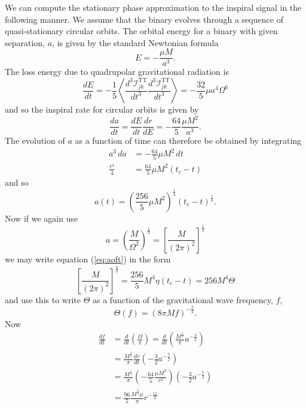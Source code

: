 We can compute the stationary phase approximation to the inspiral signal in
the following manner. We assume that the binary evolves through a sequence of
quasi-stationary circular orbits. The orbital energy for a binary with given
separation, $a$, is given by the standard Newtonian formula
\begin{equation}
E = -\frac{\mu M}{a^3}.
\end{equation}
The loss energy due to quadrupolar gravitational radiation is\cite{MTW73}
\begin{equation}
\frac{dE}{dt} = - \frac{1}{5} \left\langle 
\frac{d^3 \mathcal{I}^\mathrm{TT}_{jk}}{dt^3}
\frac{d^3 \mathcal{I}^\mathrm{TT}_{jk}}{dt^3}
\right\rangle = - \frac{32}{5}\mu a^4 \Omega^6
\end{equation}
and so the inspiral rate for circular orbits is given by
\begin{equation}
\frac{da}{dt} = \frac{dE}{dt}\frac{dr}{dE} = - \frac{64}{5}\frac{\mu
M^2}{a^3}.
\end{equation}
The evolution of $a$ as a function of time can therefore be obtained by
integrating
\begin{align}
a^3 \, da &= - \frac{64}{5} \mu M^2 \, dt \\
\frac{r^4}{4} &= \frac{64}{5} \mu M^2 (t_c - t)
\end{align}
and so
\begin{equation}
a(t) = \left(\frac{256}{5} \mu M^2 \right)^{\frac{1}{4}}
       \left(t_c - t\right)^{\frac{1}{4}}.
\label{eq:aoft}
\end{equation}
Now if we again use 
\begin{equation}
a = \left(\frac{M}{\Omega^2}\right)^\frac{1}{3} = 
\left[ \frac{M}{(2\pi)^2} \right]^\frac{1}{3}
\label{eq:aoff}
\end{equation}
we may write equation (\ref{eq:aoft}) in the form
\begin{equation}
\left[\frac{M}{(2\pi)^2}\right]^\frac{4}{3} = \frac{256}{5} M^4\eta(t_c - t) =
256 M^4 \Theta
\end{equation}
and use this to write $\Theta$ as a function of the gravitational wave
frequency, $f$,
\begin{equation}
\Theta(f) = \left(8\pi M f\right)^{-\frac{2}{3}}.
\label{eq:thetaoff}
\end{equation}
Now
\begin{align}
\frac{df}{dt} 
     &= \frac{d}{dt} \left(\frac{\Omega}{\pi}\right) 
      = \frac{d}{dt} \left(\frac{M^\frac{1}{2}}{\pi} a^{-\frac{3}{2}}\right) \\
     &= \frac{M^\frac{1}{2}}{\pi} \frac{dr}{dt} \left(-\frac{3}{2} a^{-\frac{5}{2}}\right) \\
     &= \frac{M^\frac{1}{2}}{\pi} \left(-\frac{64}{5} \frac{\mu M^2}{r^3}\right)
        \left(-\frac{3}{2} a^{-\frac{5}{2}}\right) \\
     &= \frac{96}{5} \frac{M^\frac{5}{2} \mu}{\pi} r^{-\frac{11}{2}}
\label{eq:spdfdt}
\end{align}
